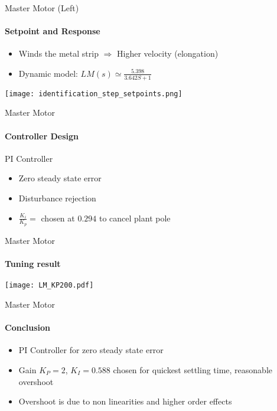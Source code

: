 \begin{frame}{Master Motor (Left)}
  \framesubtitle{Setpoint and Response}
	\begin{itemize}
		\item Winds the metal strip $\Rightarrow$ Higher velocity (elongation)
		\item Dynamic model: $LM(s) \simeq \frac{5.398}{3.642S+1}$
	\end{itemize}
	\centering
	\texttt{[image: identification\_step\_setpoints.png]}
	\end{frame}


\begin{frame}{Master Motor}
  \framesubtitle{Controller Design}
	\begin{block}{PI Controller}

		\begin{itemize}
			\item Zero steady state error
			\item Disturbance rejection
			\item $\frac{K_i}{K_p} =$ chosen at $0.294$ to cancel plant pole
		\end{itemize}
	\end{block}
\end{frame}

\begin{frame}{Master Motor}
\framesubtitle{Tuning result}
\centering
\texttt{[image: LM\_KP200.pdf]}
\end{frame}

\begin{frame}{Master Motor}
\framesubtitle{Conclusion}
\begin{itemize}
\item PI Controller for zero steady state error
\item Gain $K_P = 2$, $K_I = 0.588$ chosen for quickest settling time, reasonable overshoot
\item Overshoot is due to non linearities and higher order effects
\end{itemize}
\end{frame}
